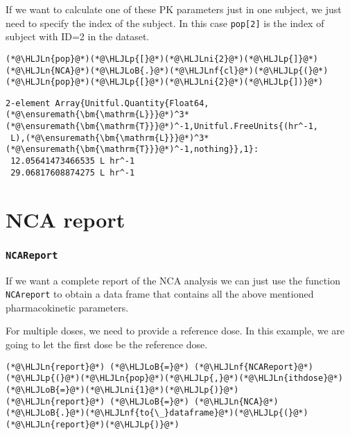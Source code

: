\documentclass[12pt,a4paper]{article}
\newcommand{\HLJLn}[1]{#1}
\newcommand{\HLJLnf}[1]{\textcolor[RGB]{66,102,213}{#1}}
\newcommand{\HLJLni}[1]{\textcolor[RGB]{59,151,46}{#1}}
\newcommand{\HLJLoB}[1]{\textcolor[RGB]{102,102,102}{\textbf{#1}}}
\newcommand{\HLJLp}[1]{#1}
\begin{document}
If we want to calculate one of these PK parameters just in one subject, we just need to specify the index of the subject. In this case \texttt{pop[2]} is the index of subject with ID=2 in the dataset.


\begin{lstlisting}
(*@\HLJLn{pop}@*)(*@\HLJLp{[}@*)(*@\HLJLni{2}@*)(*@\HLJLp{]}@*)
(*@\HLJLn{NCA}@*)(*@\HLJLoB{.}@*)(*@\HLJLnf{cl}@*)(*@\HLJLp{(}@*)(*@\HLJLn{pop}@*)(*@\HLJLp{[}@*)(*@\HLJLni{2}@*)(*@\HLJLp{])}@*)
\end{lstlisting}

\begin{lstlisting}
2-element Array{Unitful.Quantity{Float64,(*@\ensuremath{\bm{\mathrm{L}}}@*)^3*(*@\ensuremath{\bm{\mathrm{T}}}@*)^-1,Unitful.FreeUnits{(hr^-1,
 L),(*@\ensuremath{\bm{\mathrm{L}}}@*)^3*(*@\ensuremath{\bm{\mathrm{T}}}@*)^-1,nothing}},1}:
 12.05641473466535 L hr^-1
 29.06817608874275 L hr^-1
\end{lstlisting}


\section{NCA report}
\subsubsection{\texttt{NCAReport}}
If we want a complete report of the NCA analysis we can just use the function \texttt{NCAreport} to obtain a data frame that contains all the above mentioned pharmacokinetic parameters.

For multiple doses, we need to provide a reference dose. In this example, we are going to let the first dose be the reference dose.


\begin{lstlisting}
(*@\HLJLn{report}@*) (*@\HLJLoB{=}@*) (*@\HLJLnf{NCAReport}@*)(*@\HLJLp{(}@*)(*@\HLJLn{pop}@*)(*@\HLJLp{,}@*)(*@\HLJLn{ithdose}@*)(*@\HLJLoB{=}@*)(*@\HLJLni{1}@*)(*@\HLJLp{)}@*)
(*@\HLJLn{report}@*) (*@\HLJLoB{=}@*) (*@\HLJLn{NCA}@*)(*@\HLJLoB{.}@*)(*@\HLJLnf{to{\_}dataframe}@*)(*@\HLJLp{(}@*)(*@\HLJLn{report}@*)(*@\HLJLp{)}@*)
\end{lstlisting}
\end{document}
